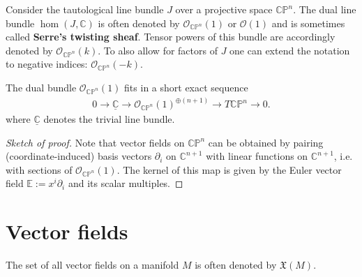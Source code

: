     \begin{definition}
        Consider the tautological line bundle $J$ over a projective space $\mathbb{C}\mathbb{P}^n$. The dual line bundle $\hom(J, \mathbb{C})$ is often denoted by $\mathcal{O}_{\mathbb{CP}^n}(1)$ or $\mathcal{O}(1)$ and is sometimes called \textbf{Serre's twisting sheaf}. Tensor powers of this bundle are accordingly denoted by $\mathcal{O}_{\mathbb{CP}^n}(k)$. To also allow for factors of $J$ one can extend the notation to negative indices: $\mathcal{O}_{\mathbb{CP}^n}(-k)$.
    \end{definition}

    \begin{property}
        The dual bundle $\mathcal{O}_{\mathbb{CP}^n}(1)$ fits in a short exact sequence
        \begin{gather}
            0\longrightarrow\underline{\mathbb{C}}\longrightarrow\mathcal{O}_{\mathbb{CP}^n}(1)^{\oplus(n+1)}\longrightarrow T\mathbb{CP}^n\longrightarrow0.
        \end{gather}
        where $\underline{\mathbb{C}}$ denotes the trivial line bundle.
        \begin{proof}[Sketch of proof]
            Note that vector fields on $\mathbb{CP}^n$ can be obtained by pairing (coordinate-induced) basis vectors $\partial_i$ on $\mathbb{C}^{n+1}$ with linear functions on $\mathbb{C}^{n+1}$, i.e. with sections of $\mathcal{O}_{\mathbb{CP}^n}(1)$. The kernel of this map is given by the Euler vector field $\mathbb{E}:=x^i\partial_i$ and its scalar multiples.
        \end{proof}
    \end{property}

\section{Vector fields}

    \begin{notation}
        The set of all vector fields on a manifold $M$ is often denoted by $\mathfrak{X}(M)$.
    \end{notation}

